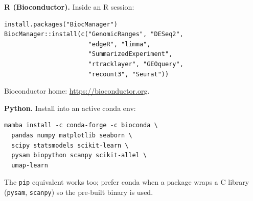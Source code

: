 \textbf{R (Bioconductor).} Inside an R session:
\begin{lstlisting}
install.packages("BiocManager")
BiocManager::install(c("GenomicRanges", "DESeq2",
                       "edgeR", "limma",
                       "SummarizedExperiment",
                       "rtracklayer", "GEOquery",
                       "recount3", "Seurat"))
\end{lstlisting}
Bioconductor home: \url{https://bioconductor.org}.

\textbf{Python.} Install into an active conda env:
\begin{lstlisting}
mamba install -c conda-forge -c bioconda \
  pandas numpy matplotlib seaborn \
  scipy statsmodels scikit-learn \
  pysam biopython scanpy scikit-allel \
  umap-learn
\end{lstlisting}
The \texttt{pip} equivalent works too; prefer conda when a package wraps a C library (\texttt{pysam}, \texttt{scanpy}) so the pre-built binary is used.
